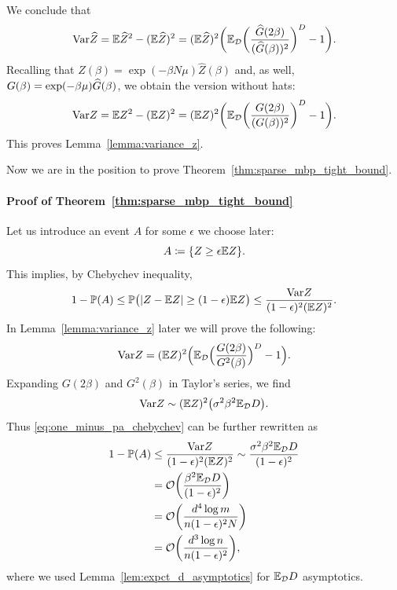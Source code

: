 We conclude that 
\begin{equation}
  {\mathrm{Var}} \widehat{Z} 
    = \mathbb{E} \widehat{Z}^2 - (\mathbb{E} \widehat Z)^2 
    =  (\mathbb{E} \widehat Z)^2 \biggl(\mathbb{E}_{\mathcal{D}} 
      \biggl( \frac{{\widehat{G}}(2 \beta)}{({\widehat{G}}(\beta) )^2} \biggr)^D - 1 \biggr).
\end{equation}
Recalling that $Z(\beta) = \exp(-\beta N \mu)
\widehat Z(\beta)$ and, as well, $G(\beta) = \exp(-\beta \mu) \widehat{G}(\beta)$, we obtain the version without hats:
\begin{equation}
  {\mathrm{Var}} {Z} 
    = \mathbb{E} Z^2 - (\mathbb{E} Z)^2 
    = (\mathbb{E} Z)^2 \biggl(\mathbb{E}_{\mathcal{D}} 
      \biggl( \frac{{G}(2 \beta)}{({G}(\beta))^2} \biggr)^D - 1 \biggr).
\end{equation}
This proves Lemma~\ref{lemma:variance_z}. \QEDA

Now we are in the position to prove Theorem~\ref{thm:sparse_mbp_tight_bound}.

\paragraph{Proof of Theorem~\ref{thm:sparse_mbp_tight_bound}}
Let us introduce an event $A$ for some $\epsilon$ we choose later:
\begin{equation}
  A \coloneqq \{ Z \ge \epsilon \mathbb{E} Z \}.
\end{equation}
This implies, by Chebychev inequality, 
\begin{equation}\label{eq:one_minus_pa_chebychev}
  1 - {\mathbb{P}}(A) \le {\mathbb{P}}\bigl( |Z - \mathbb{E} Z| \ge (1-\epsilon) \mathbb{E} Z \bigr)
    \le \frac{{\mathrm{Var}} Z}{(1-\epsilon)^2 (\mathbb{E} Z)^2}.
\end{equation}
In Lemma~\ref{lemma:variance_z} later we will prove the following:
\begin{equation}
\label{eq-varZ}
  {\mathrm{Var}} Z = (\mathbb{E} Z)^2 \Bigl( \mathbb{E}_{\cal D} 
\Bigl( \frac{G(2\beta)}{G^2(\beta)} \Bigr)^D - 1 \Bigr).
\end{equation}
Expanding $G(2\beta)$ and $G^2(\beta)$ in Taylor's series, we find
\begin{equation}
  {\mathrm{Var}} Z \sim (\mathbb{E} Z)^2 \bigl( \sigma^2 \beta^2 \mathbb{E}_{\cal D} D \bigr).
\end{equation}
Thus \eqref{eq:one_minus_pa_chebychev} can be further rewritten as
\begin{align}
  1 - {\mathbb{P}}(A) &\le \frac{{\mathrm{Var}} Z}{(1-\epsilon)^2 (\mathbb{E} Z)^2} 
    \sim \frac{\sigma^2 \beta^2 \mathbb{E}_{\cal D} D}{(1-\epsilon)^2} \notag \\
    &= \mathcal{O}\biggl( \frac{\beta^2 \mathbb{E}_{\cal D} D}{(1-\epsilon)^2} \biggr) \notag \\
    &= \mathcal{O}\biggl( \frac{d^4 \log m}{n (1-\epsilon)^2 N} \biggr) \notag \\
    &= \mathcal{O}\biggl( \frac{d^3 \log n}{n (1-\epsilon)^2} \biggr), 
      \label{eq:one_minus_pa_final_bound}
\end{align}
where we used Lemma~\ref{lem:expct_d_asymptotics} for $\mathbb{E}_{\cal D} D$ asymptotics.

